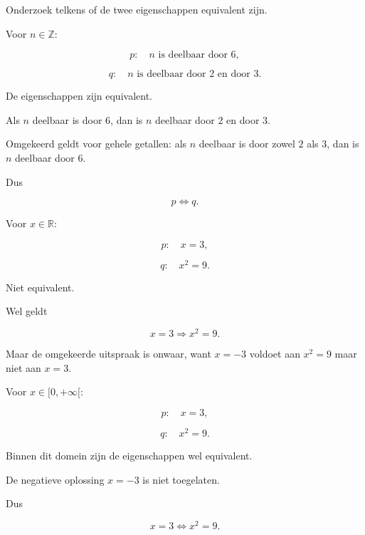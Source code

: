 \documentclass{ximera}
\begin{document}
\begin{oefening}{\oefU\ESS}

Onderzoek telkens of de twee eigenschappen equivalent zijn.

\begin{question}

Voor $n\in\mathbb{Z}$:

\[
p:\quad n\text{ is deelbaar door }6,
\]

\[
q:\quad n\text{ is deelbaar door }2\text{ en door }3.
\]

\begin{oplossing}

De eigenschappen zijn equivalent.

Als $n$ deelbaar is door $6$, dan is $n$ deelbaar door $2$ en door $3$.

Omgekeerd geldt voor gehele getallen: als $n$ deelbaar is door zowel
$2$ als $3$, dan is $n$ deelbaar door $6$.

Dus

\[
p\Leftrightarrow q.
\]

\end{oplossing}

\end{question}


\begin{question}

Voor $x\in\mathbb{R}$:

\[
p:\quad x=3,
\]

\[
q:\quad x^2=9.
\]

\begin{oplossing}

Niet equivalent.

Wel geldt

\[
x=3\Rightarrow x^2=9.
\]

Maar de omgekeerde uitspraak is onwaar, want $x=-3$ voldoet aan
$x^2=9$ maar niet aan $x=3$.

\end{oplossing}

\end{question}


\begin{question}

Voor $x\in[0,+\infty[$:

\[
p:\quad x=3,
\]

\[
q:\quad x^2=9.
\]

\begin{oplossing}

Binnen dit domein zijn de eigenschappen wel equivalent.

De negatieve oplossing $x=-3$ is niet toegelaten.

Dus

\[
x=3\Leftrightarrow x^2=9.
\]

\end{oplossing}

\end{question}

\end{oefening}
\end{document}
